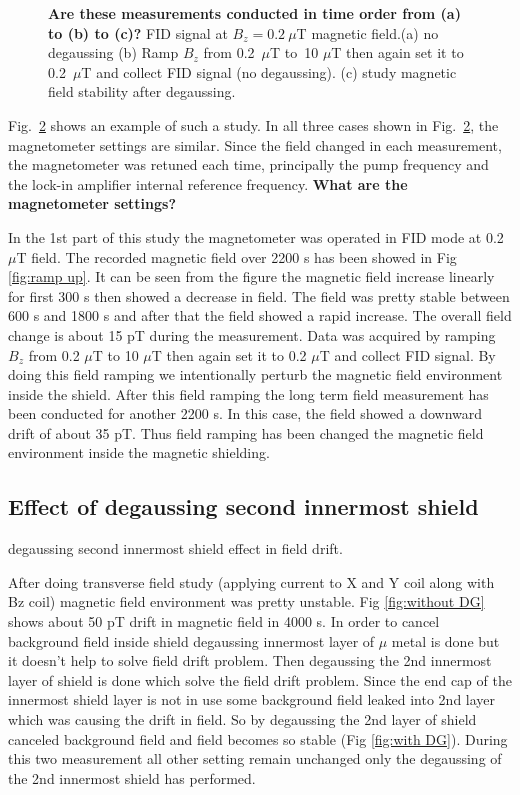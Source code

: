 \begin{figure}
\begin{subfigure}[b]{0.42\textwidth}
    \caption{}
    \label{fig:degauss}
  \end{subfigure}
  \caption{{\bf Are these measurements conducted in time order from
      (a) to (b) to (c)?}  FID signal at $B_z=0.2~\mu$T magnetic
    field.(a) no degaussing (b) Ramp $B_z$ from 0.2~$\mu$T to~10
    $\mu$T then again set it to 0.2~$\mu$T and collect FID signal (no
    degaussing). (c) study magnetic field stability after degaussing.}
  \label{fig:ramp-updown}
\end{figure}

Fig.~\ref{fig:ramp-updown} shows an example of such a study.  In all
three cases shown in Fig.~\ref{fig:ramp-updown}, the magnetometer
settings are similar.  Since the field changed in each measurement,
the magnetometer was retuned each time, principally the pump frequency
and the lock-in amplifier internal reference frequency.  {\bf What are
  the magnetometer settings?}

In the 1st part of this study the magnetometer was operated in FID
mode at 0.2 $\mu$T field. The recorded magnetic field over 2200 s has
been showed in Fig \ref{fig:ramp up}. It can be seen from the figure
the magnetic field increase linearly for first 300 s then showed a
decrease in field. The field was pretty stable between 600 s and 1800
s and after that the field showed a rapid increase. The overall field
change is about 15 pT during the measurement. Data was acquired by
ramping $B_z$ from 0.2 $\mu$T to 10 $\mu$T then again set it to 0.2
$\mu$T and collect FID signal. By doing this field ramping we
intentionally perturb the magnetic field environment inside the
shield. After this field ramping the long term field measurement has
been conducted for another 2200 s. In this case, the field showed a
downward drift of about 35 pT. Thus field ramping has been changed the
magnetic field environment inside the magnetic shielding.
   
   \subsection{Effect of degaussing second innermost shield}
   degaussing second innermost shield effect in field drift.
   
   After doing transverse field study (applying current to X and Y coil along with Bz coil) magnetic field environment was pretty unstable. Fig \ref{fig:without DG} shows about 50 pT drift in magnetic field in 4000 s. In order to cancel background field inside shield degaussing innermost layer of $\mu$ metal is done but it doesn't help to solve field drift problem. Then degaussing the 2nd innermost layer of shield is done which solve the field drift problem. Since the end cap of the innermost shield layer is not in use some background field leaked into 2nd layer which was causing the drift in field. So by degaussing the 2nd layer of shield canceled background field and field becomes so stable (Fig \ref{fig:with DG}). During this two measurement all other setting remain unchanged only the degaussing of the 2nd innermost shield has performed.
   
